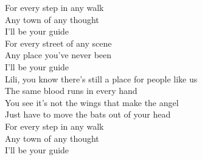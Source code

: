 \documentclass{novel}
\begin{document}
For every step in any walk \\
Any town of any thought \\
I'll be your guide \\

For every street of any scene \\
Any place you've never been \\
I'll be your guide \\

Lili, you know there's still a place for people like us \\
The same blood runs in every hand \\
You see it's not the wings that make the angel \\
Just have to move the bats out of your head \\

For every step in any walk \\
Any town of any thought \\
I'll be your guide
\end{document}
